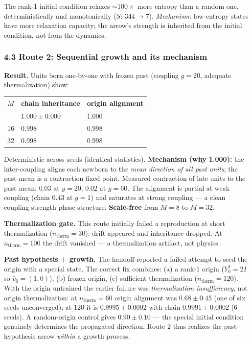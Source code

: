 The rank-1 initial condition relaxes \(\sim100\times\) more entropy than
a random one, deterministically and monotonically (\(S\): \(344\to7\)).
\emph{Mechanism:} low-entropy states have more relaxation capacity; the
arrow's strength is inherited from the initial condition, not from the
dynamics.

\subsubsection{4.3 Route 2: Sequential growth and its
mechanism}\label{route-2-sequential-growth-and-its-mechanism}

\textbf{Result.} Units born one-by-one with frozen past (coupling
\(g=20\), adequate thermalization) show:

{\def\LTcaptype{none} %
\begin{longtable}[]{@{}lll@{}}
\toprule\noalign{}
\(M\) & chain inheritance & origin alignment \\
\midrule\noalign{}
\endhead
\bottomrule\noalign{}
\endlastfoot
8 & \(1.000 \pm 0.000\) & \(1.000\) \\
16 & \(0.998\) & \(0.998\) \\
32 & \(0.998\) & \(0.998\) \\
\end{longtable}
}

Deterministic across seeds (identical statistics). \textbf{Mechanism
(why 1.000):} the inter-coupling aligns each newborn to the \emph{mean
direction of all past units}; the past-mean is a contraction fixed
point. Measured contraction of late units to the past mean: \(0.03\) at
\(g=20\), \(0.02\) at \(g=60\). The alignment is partial at weak
coupling (chain \(0.43\) at \(g=1\)) and saturates at strong coupling
--- a clean coupling-strength phase structure. \textbf{Scale-free} from
\(M=8\) to \(M=32\).

\textbf{Thermalization gate.} This route initially failed a reproduction
at short thermalization (\(n_{\mathrm{therm}}=30\)): drift appeared and
inheritance dropped. At \(n_{\mathrm{therm}}=100\) the drift vanished
--- a thermalization artifact, not physics.

\textbf{Past hypothesis + growth.} The handoff reported a failed attempt
to seed the origin with a special state. The correct fix combines: (a) a
rank-1 origin (\(Y^1_0=2I\) so \(\hat v_0=(1,0)\)), (b) frozen origin,
(c) sufficient thermalization (\(n_{\mathrm{therm}}=120\)). With the
origin untrained the earlier failure was \emph{thermalization
insufficiency}, not origin thermalization: at \(n_{\mathrm{therm}}=60\)
origin alignment was \(0.68\pm0.45\) (one of six seeds unconverged); at
\(120\) it is \textbf{\(0.9995\pm0.0002\)} with chain
\(0.9991\pm0.0002\) (6 seeds). A random-origin control gives
\(0.90\pm0.10\) --- the special initial condition genuinely determines
the propagated direction. Route 2 thus realizes the past-hypothesis
arrow \emph{within} a growth process.

